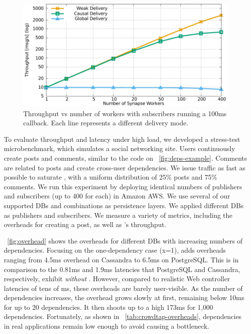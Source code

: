 \begin{figure}[]
  \centering
  \includegraphics[width=\linewidth]{figures/synapse/throughputvsworkerssaturate.pdf}
  \caption{Throughput vs number of workers with subscribers running a 100ms callback.
  Each line represents a different delivery mode.}
  \label{fig:parallel-throughput}
\end{figure}

To evaluate \synapse throughput and latency under high load, we developed a
stress-test microbenchmark, which simulates a social networking site. Users
continuously create posts and comments, similar to the code on \F~\ref{fig:deps-example}.
Comments are related to posts and create
cross-user dependencies. We issue traffic as fast as possible to saturate \synapse, with a
uniform distribution of 25\% posts and 75\% comments. We run this experiment
by deploying identical numbers of publishers and subscribers (up to 400 for
each) in Amazon AWS. We use several of our supported
DBs and combinations as persistence layers. We applied different DBs as publishers and
subscribers. We measure a variety of metrics, including the overheads for
creating a post, as well as \synapse's throughput.

\F~\ref{fig:overhead} shows the overheads for different DBs with increasing
numbers of dependencies. Focusing on the one-dependency case (x=1), \synapse
adds overheads ranging from 4.5ms overhead on Cassandra to 6.5ms on PostgreSQL.
This is in comparison to the 0.81ms and 1.9ms latencies that PostgreSQL and
Cassandra, respectively, exhibit {\em without} \synapse. However, compared to
realistic Web controller latencies of tens of ms, these overheads are barely
user-visible. As the number of dependencies increases, the overhead grows slowly
at first, remaining below 10ms for up to 20 dependencies. It then shoots up to a
high 173ms for 1,000 dependencies. Fortunately, as shown in
\F~\ref{tab:crowdtap-overheads}, dependencies in real applications remain
low enough to avoid causing a bottleneck.

